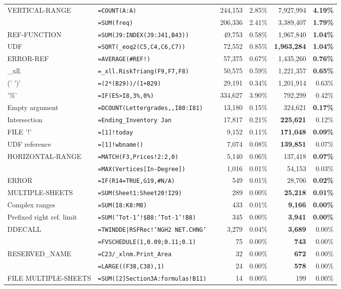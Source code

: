\begin{tabular}{llrrrrr}
			VERTICAL-RANGE & \texttt{=COUNT(A:A)} &  & 244,153 & 2.85\% & 7,927,994 & \textbf{4.19\%}\\
			\synt{NamedRange} & \texttt{=SUM(freq)} &  & 206,336 & 2.41\% & 3,389,407 & \textbf{1.79\%}\\
			REF-FUNCTION & \texttt{=SUM(J9:INDEX(J9:J41,B43))} &  & 49,753 & 0.58\% & 1,967,840 & \textbf{1.04\%}\\
			UDF & \texttt{=SQRT(_eoq2(C5,C4,C6,C7))} &  & 72,552 & 0.85\% & \textbf{1,963,284} & \textbf{1.04\%}\\
			ERROR-REF & \texttt{=AVERAGE(\#REF!)} &  & 57,375 & 0.67\% & 1,435,260 & \textbf{0.76\%}\\
			_xll. & \texttt{=_xll.RiskTriang(F9,F7,F8)} &  & 50,575 & 0.59\% & 1,221,357 & \textbf{0.65\%}\\
			(' \synt{Reference} ')' & \texttt{=(2*(B29))/(1+B29)} &  & 29,191 & 0.34\% & 1,201,914 & 0.63\%\\
			'\%' & \texttt{=IF(E5>I8,3\%,0\%)} &  & 334,627 & 3.90\% & 792,299 & 0.42\%\\
			Empty argument & \texttt{=DCOUNT(Lettergrades,,I80:I81)} &  & 13,180 & 0.15\% & 324,621 & \textbf{0.17\%}\\
			Intersection & \texttt{=Ending_Inventory Jan} &  & 17,817 & 0.21\% & \textbf{225,621} & 0.12\%\\
			FILE '!' & \texttt{=[1]!today} &  & 9,152 & 0.11\% & \textbf{171,048} & \textbf{0.09\%}\\
			UDF reference & \texttt{=[1]!wbname()} &  & 7,074 & 0.08\% & \textbf{139,851} & 0.07\%\\
			HORIZONTAL-RANGE & \texttt{=MATCH(F3,Prices!2:2,0)} &  & 5,140 & 0.06\% & 137,418 & \textbf{0.07\%}\\
			\synt{StructureReference} & \texttt{=MAX(Vertices[In-Degree])} &  & 1,016 & 0.01\% & 54,153 & 0.03\%\\
			ERROR & \texttt{=IF(R14=TRUE,G19,\#N/A)} &  & 549 & 0.01\% & 28,706 & \textbf{0.02\%}\\
			MULTIPLE-SHEETS & \texttt{=SUM(Sheet1:Sheet20!I29)} &  & 289 & 0.00\% & \textbf{25,218} & \textbf{0.01\%}\\
			Complex ranges & \texttt{=SUM(I8:K8:M8)} &  & 433 & 0.01\% & \textbf{9,166} & \textbf{0.00\%}\\
			Prefixed right ref. limit & \texttt{=SUM('Tot-1'!\$B8:'Tot-1'!B8)} &  & 345 & 0.00\% & \textbf{3,941} & \textbf{0.00\%}\\
			DDECALL & \texttt{=TWINDDE|RSFRec!'NGH2 NET.CHNG'} &  & 3,279 & 0.04\% & \textbf{3,689} & 0.00\%\\
			\synt{ConstantArray} & \texttt{=FVSCHEDULE(1,{0.09;0.11;0.1})} &  & 75 & 0.00\% & \textbf{743} & 0.00\%\\
			RESERVED_NAME & \texttt{=C23/_xlnm.Print_Area} &  & 32 & 0.00\% & \textbf{672} & 0.00\%\\
			\synt{Union} & \texttt{=LARGE((F38,C38),1)} &  & 24 & 0.00\% & \textbf{578} & 0.00\%\\
			FILE MULTIPLE-SHEETS & \texttt{=SUM([2]Section3A:formulas!B11)} &  & 14 & 0.00\% & 199 & 0.00\%\\
			\hline
	\end{tabular}